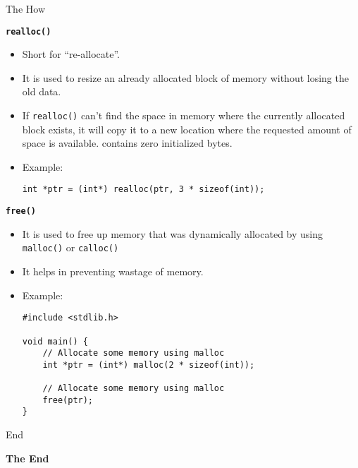 \documentclass[11pt]{beamer}
\begin{document}
\begin{frame}{The How}
        \framebreak

        \textbf{\texttt{\large realloc()}}\\[10pt]

        \begin{itemize}
            \item Short for ``re-allocate''.
            \item It is used to resize an already allocated block of memory without losing the old data.
            \item If \texttt{realloc()} can't find the space in memory where the currently allocated block exists, it
            will copy it to a new location where the requested amount of space is available.
            contains zero initialized bytes.
            \item Example:
            \begin{tcolorbox}
                \begin{verbatim}
int *ptr = (int*) realloc(ptr, 3 * sizeof(int));
                \end{verbatim}
            \end{tcolorbox}
        \end{itemize}

        \framebreak
        \textbf{\texttt{\large free()}}
        \begin{itemize}
            \item It is used to free up memory that was dynamically allocated by using \texttt{malloc()} or
            \texttt{calloc()}
            \item It helps in preventing wastage of memory.
            \item Example:
            \begin{tcolorbox}
                \begin{verbatim}
#include <stdlib.h>

void main() {
    // Allocate some memory using malloc
    int *ptr = (int*) malloc(2 * sizeof(int));

    // Allocate some memory using malloc
    free(ptr);
}
                \end{verbatim}
            \end{tcolorbox}
        \end{itemize}

    \end{frame}

    \begin{frame}{End}
        \begin{center}
            \textbf{\Huge The End}
        \end{center}
    \end{frame}
\end{document}
